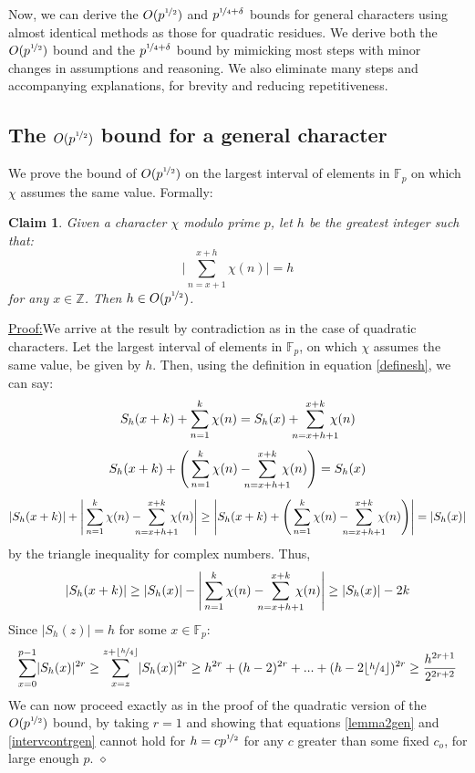 \documentclass{report}
\newtheorem*{claim*}{Claim}
\newenvironment{claimproof}[1]{\vspace{2.5mm}\par\noindent\underline{Proof:}\space#1}{\hfill $\diamond$ \vspace{2.5mm} \par}
\begin{document}
Now, we can derive the $O(p^{\nicefrac{1}{2}})$ and $p^{\nicefrac{1}{4}+\delta}$ bounds for general characters using almost identical methods as those for quadratic residues. We derive both the $O(p^{\nicefrac{1}{2}})$ bound and the $p^{\nicefrac{1}{4}+\delta}$ bound by mimicking most steps with minor changes in assumptions and reasoning. We also eliminate many steps and accompanying explanations, for brevity and reducing repetitiveness.
\subsection{The $O(p^{\nicefrac{1}{2}})$ bound for a general character}
We prove the bound of $O(p^{\nicefrac{1}{2}})$ on the largest interval of elements in $\mathbb{F}_p$ on which $\chi$ assumes the same value. Formally:
\begin{claim*}
Given a character $\chi$ modulo prime $p$, let $h$ be the greatest integer such that:
\[\bigg\lvert\sum\limits_{n=x+1}^{x+h}\chi(n)\bigg\rvert=h\]
 for any $x\in\mathbb{Z}$. Then $h\in O(p^{\nicefrac{1}{2}})$.
\end{claim*}
\begin{claimproof}
We arrive at the result by contradiction as in the case of quadratic characters. Let the largest interval of elements in $\mathbb{F}_p$, on which $\chi$ assumes the same value, be given by $h$. Then, using the definition in equation \ref{definesh}, we can say:
\[ S_h(x+k) + \sum\limits_{n=1}^k \chi(n)= S_h(x) +\  \sum\limits_{\mathclap{n=x+h+1}}^{x+k}\:\chi(n)\]
\[ S_h(x+k) + \Bigg(\sum\limits_{n=1}^k \chi(n) -\  \sum\limits_{\mathclap{n=x+h+1}}^{x+k}\:\chi(n) \Bigg) = S_h(x)\]
\[ \lvert S_h(x+k) \rvert + \Bigg\lvert\sum\limits_{n=1}^k \chi(n) -\  \sum\limits_ {\mathclap {n=x+h+1}}^{x+k} \:\chi(n) \Bigg\rvert \geq  \Bigg\lvert S_h(x+k) + \Bigg(\sum\limits_{n=1}^k \chi(n) -\  \sum\limits_ {\mathclap {n=x+h+1}}^{x+k} \:\chi(n) \Bigg) \Bigg\rvert= \lvert S_h(x)\rvert \]
by the triangle inequality for complex numbers. Thus,
\[ \lvert S_h(x+k)\rvert \geq  \lvert S_h(x)\rvert - \Bigg\lvert\sum\limits_{n=1}^k \chi(n) -\  \sum\limits_ {\mathclap {n=x+h+1}}^{x+k} \:\chi(n) \Bigg\rvert \geq \lvert S_h(x)\rvert-2k\]
Since $\lvert S_h(z)\rvert=h$ for some $x\in\mathbb{F}_p$:
\begin{equation} \label{intervcontrgen}
\sum\limits_{x=0}^{p-1}\lvert S_h(x)\rvert^{2r}\geq\sum\limits_{x=z}^{z+\lfloor\nicefrac{h}{4}\rfloor}\lvert S_h(x)\rvert^{2r} \geq h^{2r}+(h-2)^{2r}+...+(h-2\lfloor\nicefrac{h}{4}\rfloor)^{2r} \geq \frac{h^{2r+1}}{2^{2r+2}}
\end{equation}
We can now proceed exactly as in the proof of the quadratic version of the $O(p^ {\nicefrac{1}{2}})$ bound, by taking $r=1$ and showing that equations \ref{lemma2gen} and \ref{intervcontrgen} cannot hold for $h=cp ^{\nicefrac {1}{2}}$ for any $c$ greater than some fixed $c_o$, for large enough $p$.
\end{claimproof}
\end{document}
